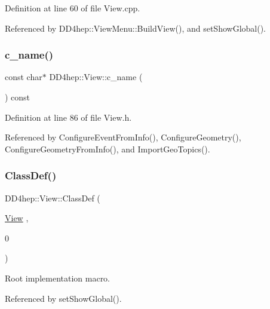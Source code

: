 Definition at line 60 of file View.\+cpp.



Referenced by D\+D4hep\+::\+View\+Menu\+::\+Build\+View(), and set\+Show\+Global().

\hypertarget{class_d_d4hep_1_1_view_ae2b74b1545ffe88efa6e28f7ab7b1af8}{}\label{class_d_d4hep_1_1_view_ae2b74b1545ffe88efa6e28f7ab7b1af8} 
\subsubsection{\texorpdfstring{c\+\_\+name()}{c\_name()}}
{\footnotesize\ttfamily const char$\ast$ D\+D4hep\+::\+View\+::c\+\_\+name (\begin{DoxyParamCaption}{ }\end{DoxyParamCaption}) const\hspace{0.3cm}{\ttfamily [inline]}}



Definition at line 86 of file View.\+h.



Referenced by Configure\+Event\+From\+Info(), Configure\+Geometry(), Configure\+Geometry\+From\+Info(), and Import\+Geo\+Topics().

\hypertarget{class_d_d4hep_1_1_view_a35dcb8a29c90f0adeba81ad4215be551}{}\label{class_d_d4hep_1_1_view_a35dcb8a29c90f0adeba81ad4215be551} 
\subsubsection{\texorpdfstring{Class\+Def()}{ClassDef()}}
{\footnotesize\ttfamily D\+D4hep\+::\+View\+::\+Class\+Def (\begin{DoxyParamCaption}\item[{\hyperlink{class_d_d4hep_1_1_view}{View}}]{,  }\item[{0}]{ }\end{DoxyParamCaption})}



Root implementation macro. 



Referenced by set\+Show\+Global().

\hypertarget{class_d_d4hep_1_1_view_a655dc004a93ab9caa56ee5a501bf492f}{}\label{class_d_d4hep_1_1_view_a655dc004a93ab9caa56ee5a501bf492f} 
